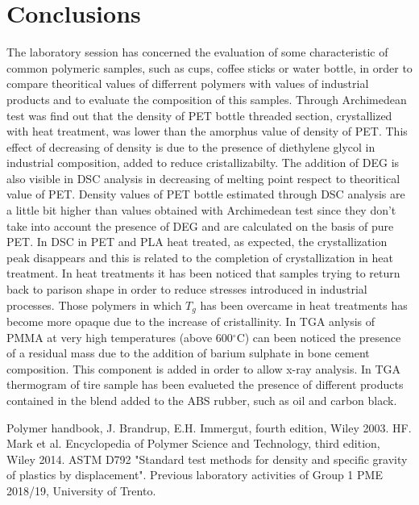 \documentclass[a4paper, 11pt]{article}
\begin{document}
\section{Conclusions}

The laboratory session has concerned the evaluation of some characteristic of common polymeric samples, such as cups, coffee sticks or water bottle, in order to compare theoritical values of  differrent polymers with values of industrial products and  to evaluate the composition of this samples.
Through Archimedean test was find out that the density of PET bottle threaded section, crystallized with heat treatment, was lower than the amorphus value of density of PET. This effect of decreasing of density is due to the presence of diethylene glycol in industrial composition, added to reduce cristallizabilty. 
The addition of DEG is also visible in DSC analysis in decreasing of melting point respect to theoritical value of PET. Density values of PET bottle estimated through DSC analysis are a little bit higher than values obtained with Archimedean test since they don't take into account the presence of DEG and are calculated on the basis of pure PET. 
In DSC in PET and PLA heat treated, as expected, the crystallization peak disappears and this is related to the completion of crystallization in heat treatment. 
In heat treatments it has been noticed that samples trying to return back to parison shape in order to reduce stresses introduced in industrial processes. Those polymers in which $T_g$ has been overcame in heat treatments has become more opaque due to the increase of cristallinity. 
In TGA anlysis of PMMA at very high temperatures (above  600$^\circ$C) can been noticed the presence of a residual mass due to the addition of barium sulphate in bone cement composition. This component is added in order to allow x-ray analysis. In TGA thermogram of tire sample has been evalueted the presence
of different products contained in the blend added to the ABS rubber, such as oil and carbon black.

\newpage
\thispagestyle{empty}

\begin{thebibliography}{1}

 Polymer handbook, J. Brandrup, E.H. Immergut, fourth edition, Wiley 2003.
 HF. Mark et al. Encyclopedia of Polymer Science and Technology, third edition, Wiley 2014.
 ASTM D792 "Standard test methods for density and specific gravity of plastics by displacement".
 Previous laboratory activities of Group 1 PME 2018/19, University of Trento. 

\end{thebibliography}
\end{document}
